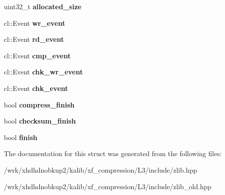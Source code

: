 \begin{DoxyCompactItemize}
\item 
\hypertarget{structxf_1_1compression_1_1buffers_ac616c2e506c9645444effb67c3b1a465}{uint32\-\_\-t {\bfseries allocated\-\_\-size}}\label{structxf_1_1compression_1_1buffers_ac616c2e506c9645444effb67c3b1a465}

\item 
\hypertarget{structxf_1_1compression_1_1buffers_a0ce3c454c580f2027e0796d454cd30e4}{cl\-::\-Event {\bfseries wr\-\_\-event}}\label{structxf_1_1compression_1_1buffers_a0ce3c454c580f2027e0796d454cd30e4}

\item 
\hypertarget{structxf_1_1compression_1_1buffers_a4fd659a33f8f0298605415dd42f92799}{cl\-::\-Event {\bfseries rd\-\_\-event}}\label{structxf_1_1compression_1_1buffers_a4fd659a33f8f0298605415dd42f92799}

\item 
\hypertarget{structxf_1_1compression_1_1buffers_ae2e6d8ae62559fc3084ec9183dd75e12}{cl\-::\-Event {\bfseries cmp\-\_\-event}}\label{structxf_1_1compression_1_1buffers_ae2e6d8ae62559fc3084ec9183dd75e12}

\item 
\hypertarget{structxf_1_1compression_1_1buffers_a1841f2e58b1dfcea72e10b1dc5760f21}{cl\-::\-Event {\bfseries chk\-\_\-wr\-\_\-event}}\label{structxf_1_1compression_1_1buffers_a1841f2e58b1dfcea72e10b1dc5760f21}

\item 
\hypertarget{structxf_1_1compression_1_1buffers_a7eb1c54115cc8f4a352fe55244dec57c}{cl\-::\-Event {\bfseries chk\-\_\-event}}\label{structxf_1_1compression_1_1buffers_a7eb1c54115cc8f4a352fe55244dec57c}

\item 
\hypertarget{structxf_1_1compression_1_1buffers_a2b6968d5742069499c3dfb2a6c931db7}{bool {\bfseries compress\-\_\-finish}}\label{structxf_1_1compression_1_1buffers_a2b6968d5742069499c3dfb2a6c931db7}

\item 
\hypertarget{structxf_1_1compression_1_1buffers_af665eca491f4948afb2f834a8905fcc4}{bool {\bfseries checksum\-\_\-finish}}\label{structxf_1_1compression_1_1buffers_af665eca491f4948afb2f834a8905fcc4}

\item 
\hypertarget{structxf_1_1compression_1_1buffers_a5f5e4499f838ed057ef5d9dd656c72a5}{bool {\bfseries finish}}\label{structxf_1_1compression_1_1buffers_a5f5e4499f838ed057ef5d9dd656c72a5}

\end{DoxyCompactItemize}


The documentation for this struct was generated from the following files\-:\begin{DoxyCompactItemize}
\item 
/wrk/xhdhdnobkup2/kalib/xf\-\_\-compression/\-L3/include/zlib.\-hpp\item 
/wrk/xhdhdnobkup2/kalib/xf\-\_\-compression/\-L3/include/zlib\-\_\-old.\-hpp\end{DoxyCompactItemize}
